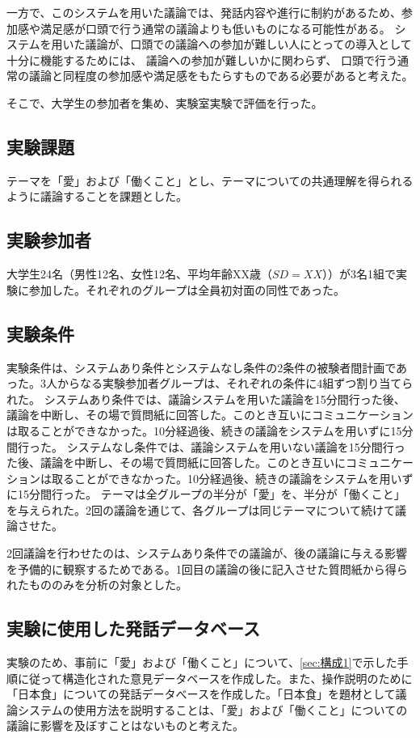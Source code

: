 \documentclass[11pt, a4paper]{jreport} %
\begin{document}
一方で、このシステムを用いた議論では、発話内容や進行に制約があるため、参加感や満足感が口頭で行う通常の議論よりも低いものになる可能性がある。
システムを用いた議論が、口頭での議論への参加が難しい人にとっての導入として十分に機能するためには、
議論への参加が難しいかに関わらず、
口頭で行う通常の議論と同程度の参加感や満足感をもたらすものである必要があると考えた。

そこで、大学生の参加者を集め、実験室実験で評価を行った。

\subsection{実験課題}
テーマを「愛」および「働くこと」とし、テーマについての共通理解を得られるように議論することを課題とした。


\subsection{実験参加者}
大学生24名（男性12名、女性12名、平均年齢XX歳（$SD=XX$））が3名1組で実験に参加した。それぞれのグループは全員初対面の同性であった。

\subsection{実験条件}
実験条件は、システムあり条件とシステムなし条件の2条件の被験者間計画であった。3人からなる実験参加者グループは、それぞれの条件に4組ずつ割り当てられた。
システムあり条件では、議論システムを用いた議論を15分間行った後、議論を中断し、その場で質問紙に回答した。このとき互いにコミュニケーションは取ることができなかった。10分経過後、続きの議論をシステムを用いずに15分間行った。
システムなし条件では、議論システムを用いない議論を15分間行った後、議論を中断し、その場で質問紙に回答した。このとき互いにコミュニケーションは取ることができなかった。10分経過後、続きの議論をシステムを用いずに15分間行った。
テーマは全グループの半分が「愛」を、半分が「働くこと」を与えられた。2回の議論を通じて、各グループは同じテーマについて続けて議論させた。


2回議論を行わせたのは、システムあり条件での議論が、後の議論に与える影響を予備的に観察するためである。1回目の議論の後に記入させた質問紙から得られたもののみを分析の対象とした。

\subsection{実験に使用した発話データベース}
実験のため、事前に「愛」および「働くこと」について、\ref{sec:構成1}で示した手順に従って構造化された意見データベースを作成した。また、操作説明のために「日本食」についての発話データべースを作成した。「日本食」を題材として議論システムの使用方法を説明することは、「愛」および「働くこと」についての議論に影響を及ぼすことはないものと考えた。
\end{document}
